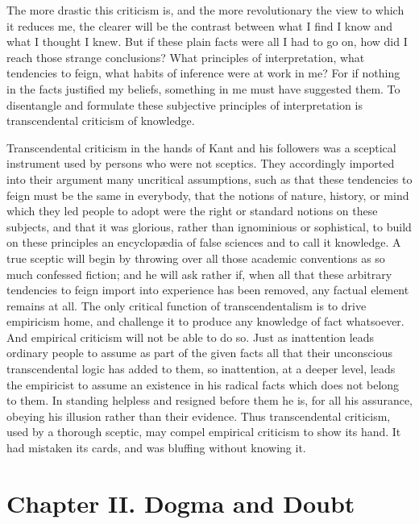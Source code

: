 The more drastic this criticism is, and the more revolutionary
the view to which it reduces me, the clearer will be the contrast
between what I find I know and what I thought I knew. But if these
plain facts were all I had to go on, how did I reach those strange
conclusions? What principles of interpretation, what tendencies to
feign, what habits of inference were at work in me? For if nothing in
the facts justified my beliefs, something in me must have suggested
them. To disentangle and formulate these subjective principles of
interpretation is transcendental criticism of knowledge.

Transcendental criticism in the hands of Kant and his followers was a
sceptical instrument used by persons who were not sceptics. They
accordingly imported into their argument many uncritical assumptions,
such as that these tendencies to feign must be the same in everybody,
that the notions of nature, history, or mind which they led people to
adopt were the right or standard notions on these subjects, and that
it was glorious, rather than ignominious or sophistical, to build on
these principles an encyclop\ae dia of false sciences and to call it
knowledge. A true sceptic will begin by throwing over all those
academic conventions as so much confessed fiction; and he will ask
rather if, when all that these arbitrary tendencies to feign import
into experience has been removed, any factual element remains at all.
The only critical function of transcendentalism is to drive empiricism
home, and challenge it to produce any knowledge of fact whatsoever.
And empirical criticism will not be able to do so. Just as inattention
leads ordinary people to assume as part of the given facts all that
their unconscious transcendental logic has added to them, so
inattention, at a deeper level, leads the empiricist to assume an
existence in his radical facts which does not belong to them. In
 standing helpless and resigned before them he is, for all his
assurance, obeying his illusion rather than their evidence. Thus
transcendental criticism, used by a thorough sceptic, may compel
empirical criticism to show its hand. It had mistaken its cards, and
was bluffing without knowing it.

\section*{Chapter II. Dogma and Doubt}

